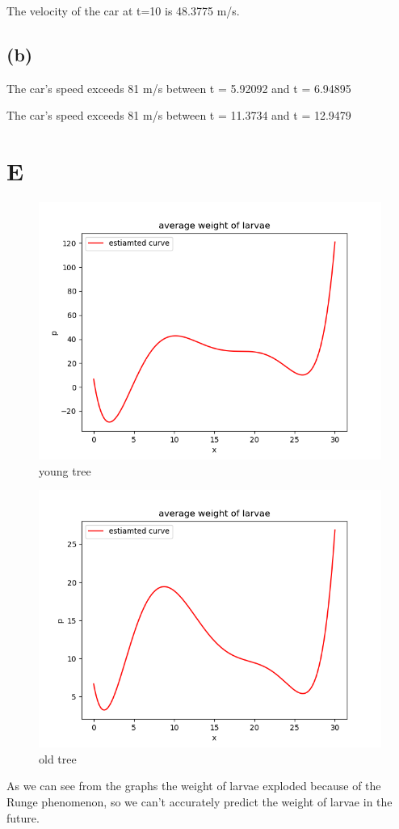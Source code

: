 \documentclass{article}
\begin{document}
    The velocity of the car at t=10 is 48.3775 m/s.

    \subsection{(b)}
    The car's speed exceeds 81 m/s between t = 5.92092 and t = 6.94895
    
    The car's speed exceeds 81 m/s between t = 11.3734 and t = 12.9479

\section{E}
    \begin{figure}[H]
        \centering
        \includegraphics{../code/output/E_0.png}
        \caption{young tree}
    \end{figure} 

    \begin{figure}[H]
        \centering
        \includegraphics{../code/output/E_1.png}
        \caption{old tree}
    \end{figure}

    As we can see from the graphs the weight of larvae exploded because of the Runge phenomenon,
    so we can't accurately predict the weight of larvae in the future.
\end{document}
